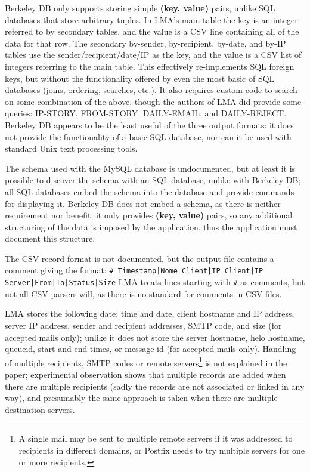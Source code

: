 Berkeley DB only supports storing simple \textbf{(key, value)} pairs,
unlike \gls{SQL} databases that store arbitrary tuples.  In \gls{LMA}'s
main table the key is an integer referred to by secondary tables, and the
value is a \gls{CSV} line containing all of the data for that row.  The
secondary by-sender, by-recipient, by-date, and by-\gls{IP} tables use the
sender/recipient/date/\gls{IP} as the key, and the value is a \gls{CSV}
list of integers referring to the main table.  This effectively
re-implements \gls{SQL} foreign keys, but without the functionality offered
by even the most basic of \gls{SQL} databases (joins, ordering, searches,
etc.).  It also requires custom code to search on some combination of the
above, though the authors of \gls{LMA} did provide some queries: IP-STORY,
FROM-STORY, DAILY-EMAIL, and DAILY-REJECT\@.  Berkeley DB appears to be the
least useful of the three output formats: it does not provide the
functionality of a basic \gls{SQL} database, nor can it be used with
standard Unix text processing tools.

The schema used with the MySQL database is undocumented, but at least it is
possible to discover the schema with an \gls{SQL} database, unlike with
Berkeley DB\@; all \gls{SQL} databases embed the schema into the database
and provide commands for displaying it.  Berkeley DB does not embed a
schema, as there is neither requirement nor benefit; it only provides
\textbf{(key, value)} pairs, so any additional structuring of the data is
imposed by the application, thus the application must document this
structure.

The \gls{CSV} record format is not documented, but the output file contains
a comment giving the format:\newline{} \texttt{\# Timestamp|Nome Client|IP
Client|IP Server|From|To|Status|Size} \newline{}\gls{LMA} treats lines
starting with \texttt{\#} as comments, but not all \gls{CSV} parsers will,
as there is no standard for comments in \gls{CSV} files.

\gls{LMA} stores the following date: time and date, client hostname and
\gls{IP} address, server \gls{IP} address, sender and recipient addresses,
\gls{SMTP} code, and size (for accepted mails only); unlike \parsername{}
it does not store the server hostname, helo hostname, queueid, start and
end times, or message id (for accepted mails only).  Handling of multiple
recipients, \gls{SMTP} codes or remote servers\footnote{A single mail may
be sent to multiple remote servers if it was addressed to recipients in
different domains, or Postfix needs to try multiple servers for one or more
recipients.} is not explained in the paper; experimental observation shows
that multiple records are added when there are multiple recipients (sadly
the records are not associated or linked in any way), and presumably the
same approach is taken when there are multiple destination servers.

